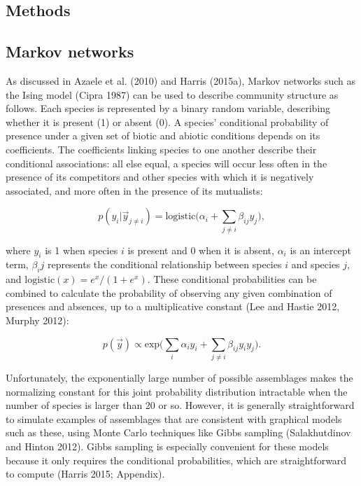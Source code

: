 \documentclass[12pt,]{article}
\begin{document}
\begin{spacing}{1.9}
\begin{flushleft}
\section{Methods}\label{methods}

\subsection{Markov networks}\label{markov-networks}

As discussed in Azaele et al. (2010) and Harris (2015a), Markov networks
such as the Ising model (Cipra 1987) can be used to describe community
structure as follows. Each species is represented by a binary random
variable, describing whether it is present (1) or absent (0). A species'
conditional probability of presence under a given set of biotic and
abiotic conditions depends on its coefficients. The coefficients linking
species to one another describe their conditional associations: all else
equal, a species will occur less often in the presence of its
competitors and other species with which it is negatively associated,
and more often in the presence of its mutualists:

\[ p(y_i | \vec{y}_{j \neq i}) = \mathrm{logistic}\Big(\alpha_i + \sum_{j \neq i}{\beta_{ij}y_j}\Big), \]

where \(y_i\) is 1 when species \(i\) is present and 0 when it is
absent, \(\alpha_i\) is an intercept term, \(\beta_ij\) represents the
conditional relationship between species \(i\) and species \(j\), and
\(\mathrm{logistic}(x) = e^x / (1 + e^x)\). These conditional
probabilities can be combined to calculate the probability of observing
any given combination of presences and absences, up to a multiplicative
constant (Lee and Hastie 2012, Murphy 2012):

\[p(\vec{y}) \propto \mathrm{exp}\Big({\sum_{i}{\alpha_i y_i} + \sum_{j \neq i}}{\beta_{ij} y_i y_j}\Big).\]

Unfortunately, the exponentially large number of possible assemblages
makes the normalizing constant for this joint probability distribution
intractable when the number of species is larger than 20 or so. However,
it is generally straightforward to simulate examples of assemblages that
are consistent with graphical models such as these, using Monte Carlo
techniques like Gibbs sampling (Salakhutdinov and Hinton 2012). Gibbs
sampling is especially convenient for these models because it only
requires the conditional probabilities, which are straightforward to
compute (Harris 2015; Appendix).


\end{flushleft}
\end{spacing}
\end{document}
